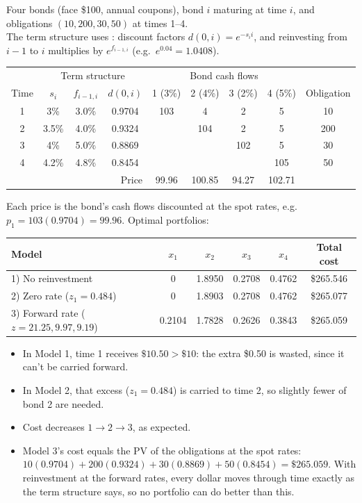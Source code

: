 \begin{example}
    Four bonds (face \$100, annual coupons), bond $i$ maturing at time $i$, and obligations $(10, 200, 30, 50)$ at times 1--4.
    \\The term structure uses : discount factors $d(0,i) = e^{-s_i i}$, and reinvesting from $i-1$ to $i$ multiplies by $e^{f_{i-1,i}}$ (e.g.\ $e^{0.04} = 1.0408$).
    \begin{center}
    \begin{tabular}{c|ccc|cccc|c}
        \toprule
        & \multicolumn{3}{c|}{Term structure} & \multicolumn{4}{c|}{Bond cash flows} & \\
        Time & $s_i$ & $f_{i-1,i}$ & $d(0,i)$ & 1 (3\%) & 2 (4\%) & 3 (2\%) & 4 (5\%) & Obligation\\
        \midrule
        1 & 3\% & 3.0\% & 0.9704 & 103 & 4 & 2 & 5 & 10\\
        2 & 3.5\% & 4.0\% & 0.9324 & & 104 & 2 & 5 & 200\\
        3 & 4\% & 5.0\% & 0.8869 & & & 102 & 5 & 30\\
        4 & 4.2\% & 4.8\% & 0.8454 & & & & 105 & 50\\
        \midrule
        \multicolumn{4}{r|}{Price} & 99.96 & 100.85 & 94.27 & 102.71 & \\
        \bottomrule
    \end{tabular}
    \end{center}
    Each price is the bond's cash flows discounted at the spot rates, e.g.\ $p_1 = 103(0.9704) = 99.96$. Optimal portfolios:
    \begin{center}
    \begin{tabular}{lccccc}
        \toprule
        Model & $x_1$ & $x_2$ & $x_3$ & $x_4$ & Total cost\\
        \midrule
        1) No reinvestment & 0 & 1.8950 & 0.2708 & 0.4762 & \$265.546\\
        2) Zero rate ($z_1 = 0.484$) & 0 & 1.8903 & 0.2708 & 0.4762 & \$265.077\\
        3) Forward rate ($z = 21.25, 9.97, 9.19$) & 0.2104 & 1.7828 & 0.2626 & 0.3843 & \$265.059\\
        \bottomrule
    \end{tabular}
    \end{center}
    \begin{itemize}
        \item In Model 1, time 1 receives $\$10.50 > \$10$: the extra \$0.50 is wasted, since it can't be carried forward.
        \item In Model 2, that excess ($z_1 = 0.484$) is carried to time 2, so slightly fewer of bond 2 are needed.
        \item Cost decreases $1 \to 2 \to 3$, as expected.
        \item Model 3's cost equals the PV of the obligations at the spot rates: $10(0.9704) + 200(0.9324) + 30(0.8869) + 50(0.8454) = \$265.059$. With reinvestment at the forward rates, every dollar moves through time exactly as the term structure says, so no portfolio can do better than this.
    \end{itemize}
\end{example}

